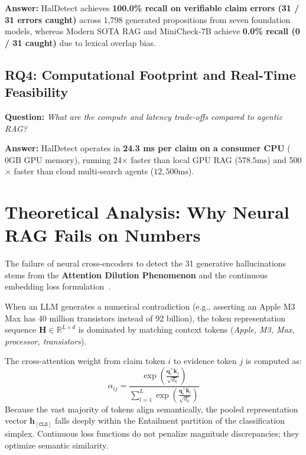 \textbf{Answer:} HalDetect achieves \textbf{100.0\% recall on verifiable claim errors (31 / 31 errors caught)} across 1,798 generated propositions from seven foundation models, whereas Modern SOTA RAG and MiniCheck-7B achieve \textbf{0.0\% recall (0 / 31 caught)} due to lexical overlap bias.

\subsection{RQ4: Computational Footprint and Real-Time Feasibility}
\textbf{Question:} \textit{What are the compute and latency trade-offs compared to agentic RAG?}

\textbf{Answer:} HalDetect operates in \textbf{24.3 ms per claim on a consumer CPU} ($0\text{GB}$ GPU memory), running 24$\times$ faster than local GPU RAG ($578.5\text{ms}$) and 500$\times$ faster than cloud multi-search agents ($12,500\text{ms}$).

\section{Theoretical Analysis: Why Neural RAG Fails on Numbers}
\label{sec:theoretical_failure}

The failure of neural cross-encoders to detect the 31 generative hallucinations stems from the \textbf{Attention Dilution Phenomenon} and the continuous embedding loss formulation~.

When an LLM generates a numerical contradiction (e.g., asserting an Apple M3 Max has 40 million transistors instead of 92 billion), the token representation sequence $\mathbf{H} \in \mathbb{R}^{L \times d}$ is dominated by matching context tokens (\textit{Apple, M3, Max, processor, transistors}).

The cross-attention weight from claim token $i$ to evidence token $j$ is computed as:
\begin{equation}
    \alpha_{ij} = \frac{\exp\left(\frac{\mathbf{q}_i^\top \mathbf{k}_j}{\sqrt{d_k}}\right)}{\sum_{l=1}^L \exp\left(\frac{\mathbf{q}_i^\top \mathbf{k}_l}{\sqrt{d_k}}\right)}
\end{equation}
Because the vast majority of tokens align semantically, the pooled representation vector $\mathbf{h}_{[\texttt{CLS}]}$ falls deeply within the Entailment partition of the classification simplex. Continuous loss functions do not penalize magnitude discrepancies; they optimize semantic similarity.

